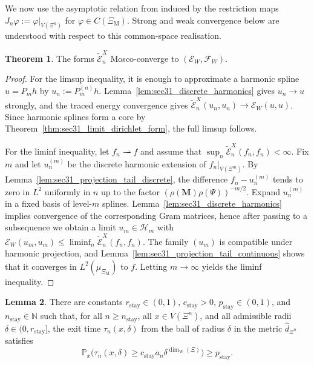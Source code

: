 \documentclass{article}
\theoremstyle{plain}
\theoremstyle{definition}
\newtheorem{theorem}{Theorem}[section]
\newtheorem{lemma}[theorem]{Lemma}
\newcommand{\dimwalk}{\dim_\mathrm{W}}
\begin{document}
We now use the asymptotic relation from \cite{kuwae2003convergence} induced by the restriction maps $J_n\varphi:=\varphi|_{V(\Xi^n)}$ for $\varphi\in C(\Xi_{\mathrm M})$.
Strong and weak convergence below are understood with respect to this common-space realisation.

\begin{theorem}\label{thm:sec31_mosco}
The forms $\widetilde{\mathcal E}_n^{X}$ Mosco-converge to $(\mathcal E_W,\mathcal F_W)$.
\end{theorem}

\begin{proof}
For the limsup inequality, it is enough to approximate a harmonic spline $u=P_mh$ by $u_n:=P_m^{(n)}h$.
Lemma~\ref{lem:sec31_discrete_harmonics} gives $u_n\to u$ strongly, and the traced energy convergence gives $\widetilde{\mathcal E}_n^X(u_n,u_n)\to \mathcal E_W(u,u)$.
Since harmonic splines form a core by Theorem~\ref{thm:sec31_limit_dirichlet_form}, the full limsup follows.

For the liminf inequality, let $f_n\rightharpoonup f$ and assume that $\sup_n\widetilde{\mathcal E}_n^X(f_n,f_n)<\infty$.
Fix $m$ and let $u_n^{(m)}$ be the discrete harmonic extension of $f_n|_{V(\Xi^m)}$.
By Lemma~\ref{lem:sec31_projection_tail_discrete}, the difference $f_n-u_n^{(m)}$ tends to zero in $L^2$ uniformly in $n$ up to the factor $(\rho(\mathbf M)\rho(\Psi))^{-m/2}$.
Expand $u_n^{(m)}$ in a fixed basis of level-$m$ splines.
Lemma~\ref{lem:sec31_discrete_harmonics} implies convergence of the corresponding Gram matrices, hence after passing to a subsequence we obtain a limit $u_m\in \mathcal H_m$ with $\mathcal E_W(u_m,u_m)\le \liminf_n\widetilde{\mathcal E}_n^X(f_n,f_n)$.
The family $(u_m)$ is compatible under harmonic projection, and Lemma~\ref{lem:sec31_projection_tail_continuous} shows that it converges in $L^2(\mu_{\Xi_{\mathrm M}})$ to $f$.
Letting $m\to\infty$ yields the liminf inequality.
\end{proof}

\begin{lemma}\label{lem:sec31_one_step_stay}
There are constants $r_{\mathrm{stay}}\in(0,1)$, $c_{\mathrm{stay}}>0$, $p_{\mathrm{stay}}\in(0,1)$, and $n_{\mathrm{stay}}\in\mathbb N$ such that, for all $n\ge n_{\mathrm{stay}}$, all $x\in V(\Xi^n)$, and all admissible radii $\delta\in(0,r_{\mathrm{stay}}]$, the exit time $\tau_n(x,\delta)$ from the ball of radius $\delta$ in the metric $\hat d_{\Xi^n}$ satisfies
\[
\mathbb P_x\bigl(\tau_n(x,\delta)\ge c_{\mathrm{stay}}a_n\delta^{\dimwalk(\Xi)}\bigr)\ge p_{\mathrm{stay}}.
\]
\end{lemma}
\end{document}
